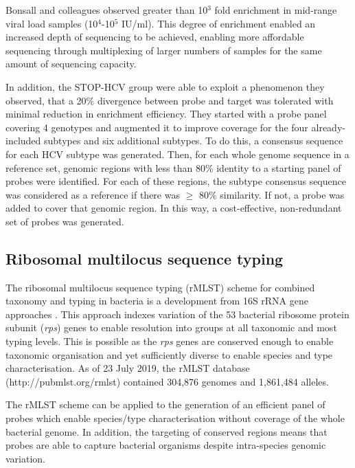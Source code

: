 Bonsall and colleagues observed greater than 10$^{3}$ fold enrichment in mid-range viral load samples (10$^{4}$-10$^{5}$ IU/ml). This degree of enrichment enabled an increased depth of sequencing to be achieved, enabling more affordable sequencing through multiplexing of larger numbers of samples for the same amount of sequencing capacity.

In addition, the STOP-HCV group were able to exploit a phenomenon they observed, that a 20\% divergence between probe and target was tolerated with minimal reduction in enrichment efficiency. They started with a probe panel covering 4 genotypes and augmented it to improve coverage for the four already-included subtypes and six additional subtypes. To do this, a consensus sequence for each HCV subtype was generated. Then, for each whole genome sequence in a reference set, genomic regions with less than 80\% identity to a starting panel of probes were identified. For each of these regions, the subtype consensus sequence was considered as a reference if there was $\geq$ 80\% similarity. If not, a probe was added to cover that genomic region. In this way, a cost-effective, non-redundant set of probes was generated.

\subsection{Ribosomal multilocus sequence typing}
The ribosomal multilocus sequence typing (rMLST) scheme \parencite{Jolley2012} for combined taxonomy and typing in bacteria is a development from 16S rRNA gene approaches \parencite{Woese1987}. This approach indexes variation of the 53 bacterial ribosome protein subunit (\textit{rps}) genes to enable resolution into groups at all taxonomic and most typing levels. This is possible as the \textit{rps} genes are conserved enough to enable taxonomic organisation and yet sufficiently diverse to enable species and type characterisation. As of 23 July 2019, the rMLST database (http://pubmlst.org/rmlst) contained 304,876 genomes and 1,861,484 alleles. 

The rMLST scheme can be applied to the generation of an efficient panel of probes which enable species/type characterisation without coverage of the whole bacterial genome. In addition, the targeting of conserved regions means that probes are able to capture bacterial organisms despite intra-species genomic variation.

